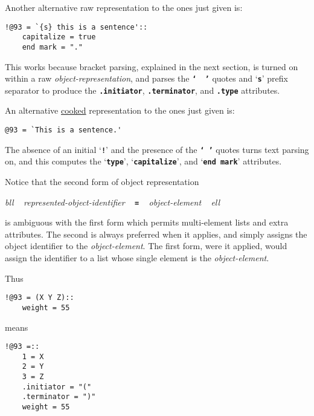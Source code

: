 \documentclass[12pt]{article}
\newcommand{\TT}[1]{{\tt \bfseries #1}}
\newenvironment{indpar}[1][0.3in]%
	{\begin{list}{}%
		     {\setlength{\itemsep}{0in}%
		      \setlength{\topsep}{0in}%
		      \setlength{\parsep}{1ex}%
		      \setlength{\labelwidth}{#1}%
		      \setlength{\leftmargin}{#1}%
		      \addtolength{\leftmargin}{\labelsep}}%
	 \item}%
	{\end{list}}
\begin{document}
Another alternative raw representation to the ones just
given is:

\begin{indpar}\begin{verbatim}
!@93 = `{s} this is a sentence'::
    capitalize = true
    end mark = "."
\end{verbatim}\end{indpar}

This works because bracket parsing, explained in the next section,
is turned on within a raw {\em object-representation}, and parses
the \TT{`~~'} quotes and `\TT{s}' prefix separator to produce the
\TT{.initiator}, \TT{.terminator}, and \TT{.type} attributes.

An alternative \underline{cooked} representation to the ones just
given is:

\begin{indpar}\begin{verbatim}
@93 = `This is a sentence.'
\end{verbatim}\end{indpar}

The absence of an initial `\TT{!}' and the presence of the \TT{`~'}
quotes turns text parsing on, and this
computes the `\TT{type}', `\TT{capitalize}', and `\TT{end mark}' attributes.

Notice that the second form of object representation
\begin{center}
{\em bll} ~ {\em represented-object-identifier} ~ \TT{=} ~
	    {\em object-element} ~ {\em ell} \\
\end{center}

is ambiguous with the first form which permits multi-element lists
and extra attributes.  The second is always preferred when it applies,
and simply assigns the object identifier to the {\em object-element}.
The first form, were it applied, would assign the identifier to a list
whose single element is the {\em object-element}.

Thus

\begin{indpar}\begin{verbatim}
!@93 = (X Y Z)::
    weight = 55
\end{verbatim}\end{indpar}

means

\begin{indpar}\begin{verbatim}
!@93 =::
    1 = X
    2 = Y
    3 = Z
    .initiator = "("
    .terminator = ")"
    weight = 55
\end{verbatim}\end{indpar}
\end{document}
